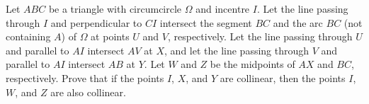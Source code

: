 Let $ABC$ be a triangle with circumcircle $\Omega$ and incentre $I$.
Let the line passing through $I$ and perpendicular to $CI$ intersect the segment $BC$ and the arc $BC$ (not containing $A$) of $\Omega$ at points $U$ and $V$, respectively.
Let the line passing through $U$ and parallel to $AI$ intersect $AV$ at $X$, and let the line passing through $V$ and parallel to $AI$ intersect $AB$ at $Y$.
Let $W$ and $Z$ be the midpoints of $AX$ and $BC$,  respectively.
Prove that if the points $I$, $X$, and $Y$ are collinear, then the points $I$, $W$, and $Z$ are also collinear.
